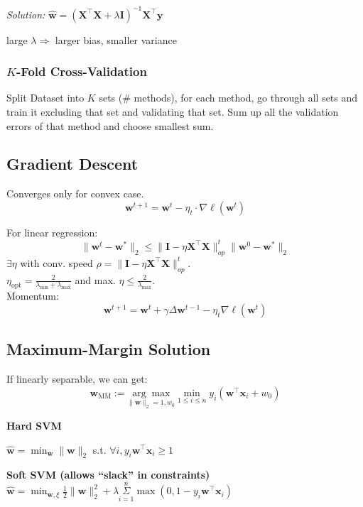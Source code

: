 \documentclass[a4paper,11pt]{article}
\begin{document}
\textit{Solution:} $\hat{\mathbf{w}} = (\mathbf{X}^{\top} \mathbf{X} + \lambda \mathbf{I})^{-1} \mathbf{X}^{\top} \mathbf{y}$

large $\lambda \Rightarrow$ larger bias, smaller variance


\subsubsection*{$K$-Fold Cross-Validation}
Split Dataset into $K$ sets (\# methods), for each method, go through all sets and train it excluding that set and validating that set. Sum up all the validation errors of that method and choose smallest sum.


\subsection*{Gradient Descent}
Converges only for convex case.
$$
\mathbf{w}^{t+1}=\mathbf{w}^t-\eta_t \cdot \nabla \ell(\mathbf{w}^t)
$$

For linear regression:
$$
\|\mathbf{w}^t-\mathbf{w}^*\|_2 \leq \|\mathbf{I}-\eta \mathbf{X}^{\top} \mathbf{X}\|_{op}^t \|\mathbf{w}^0-\mathbf{w}^*\|_2
$$
$\exists\eta$ with conv. speed $\rho=\|\mathbf{I}-\eta \mathbf{X}^{\top} \mathbf{X}\|_{op}^t$.\\
$\eta_{\text{opt}}=\frac{2}{\lambda_{\min }+\lambda_{\max }}$ and max. $\eta \leq \frac{2}{\lambda_{\max }}$.\\
Momentum: 
$$
\mathbf{w}^{t+1}=\mathbf{w}^t+\gamma \Delta \mathbf{w}^{t-1}-\eta_t \nabla \ell(\mathbf{w}^t)
$$

\subsection*{Maximum-Margin Solution}
If linearly separable, we can get:
$$\boldsymbol{w}_{\mathrm{MM}}:=\underset{\|\boldsymbol{w}\|_2=1, w_0}{\arg \max } \min _{1 \leq i \leq n} y_i(\boldsymbol{w}^\top\boldsymbol{x}_i+w_0)$$

\textbf{Hard SVM}

$\hat{\mathbf{w}} = \min _{\mathbf{w}} \|\mathbf{w}\|_2$ s.t. $\forall i, y_i \mathbf{w}^{\top} \mathbf{x}_i \geq 1$

\textbf{Soft SVM (allows ``slack'' in constraints)}\\
$\hat{\mathbf{w}} = \min _{\mathbf{w}, \xi} \frac{1}{2}\|\mathbf{w}\|_2^2 + \lambda \overset{n}{\underset{i=1}{\Sigma}} \max \left(0, 1 - y_i \mathbf{w}^{\top} \mathbf{x}_i\right)$
\end{document}

